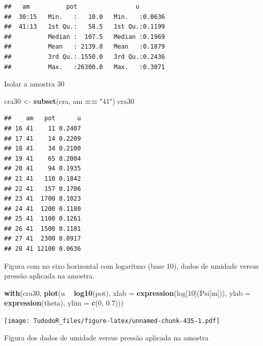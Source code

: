 \documentclass[
]{book}
\newenvironment{Shaded}{\begin{snugshade}}{\end{snugshade}}
\newcommand{\DataTypeTok}[1]{\textcolor[rgb]{0.13,0.29,0.53}{#1}}
\newcommand{\DecValTok}[1]{\textcolor[rgb]{0.00,0.00,0.81}{#1}}
\newcommand{\FloatTok}[1]{\textcolor[rgb]{0.00,0.00,0.81}{#1}}
\newcommand{\KeywordTok}[1]{\textcolor[rgb]{0.13,0.29,0.53}{\textbf{#1}}}
\newcommand{\NormalTok}[1]{#1}
\newcommand{\OperatorTok}[1]{\textcolor[rgb]{0.81,0.36,0.00}{\textbf{#1}}}
\newcommand{\StringTok}[1]{\textcolor[rgb]{0.31,0.60,0.02}{#1}}
\begin{document}
\begin{verbatim}
##   am          pot                u         
##  30:15   Min.   :   10.0   Min.   :0.0636  
##  41:13   1st Qu.:   58.5   1st Qu.:0.1199  
##          Median :  107.5   Median :0.1969  
##          Mean   : 2139.8   Mean   :0.1879  
##          3rd Qu.: 1550.0   3rd Qu.:0.2436  
##          Max.   :26300.0   Max.   :0.3071
\end{verbatim}

Isolar a amostra 30

\begin{Shaded}
\begin{Highlighting}[]
\NormalTok{cra30 <-}\StringTok{ }\KeywordTok{subset}\NormalTok{(cra, am }\OperatorTok{==}\StringTok{ "41"}\NormalTok{)}
\NormalTok{cra30}
\end{Highlighting}
\end{Shaded}

\begin{verbatim}
##    am   pot      u
## 16 41    11 0.2407
## 17 41    14 0.2209
## 18 41    34 0.2100
## 19 41    65 0.2004
## 20 41    94 0.1935
## 21 41   110 0.1842
## 22 41   157 0.1706
## 23 41  1700 0.1023
## 24 41  1200 0.1180
## 25 41  1100 0.1261
## 26 41  1500 0.1101
## 27 41  2300 0.0917
## 28 41 12100 0.0636
\end{verbatim}

Figura com no eixo horizontal com logarítmo (base 10), dados de umidade versus pressão aplicada na amostra.

\begin{Shaded}
\begin{Highlighting}[]
\KeywordTok{with}\NormalTok{(cra30, }\KeywordTok{plot}\NormalTok{(u }\OperatorTok{~}\StringTok{ }\KeywordTok{log10}\NormalTok{(pot), }\DataTypeTok{xlab =} \KeywordTok{expression}\NormalTok{(log[}\DecValTok{10}\NormalTok{](Psi[m])), }\DataTypeTok{ylab =} \KeywordTok{expression}\NormalTok{(theta), }\DataTypeTok{ylim =} \KeywordTok{c}\NormalTok{(}\DecValTok{0}\NormalTok{, }\FloatTok{0.7}\NormalTok{)))}
\end{Highlighting}
\end{Shaded}

\texttt{[image: TudodoR\_files/figure-latex/unnamed-chunk-435-1.pdf]}

Figura dos dados de umidade versus pressão aplicada na amostra
\end{document}
